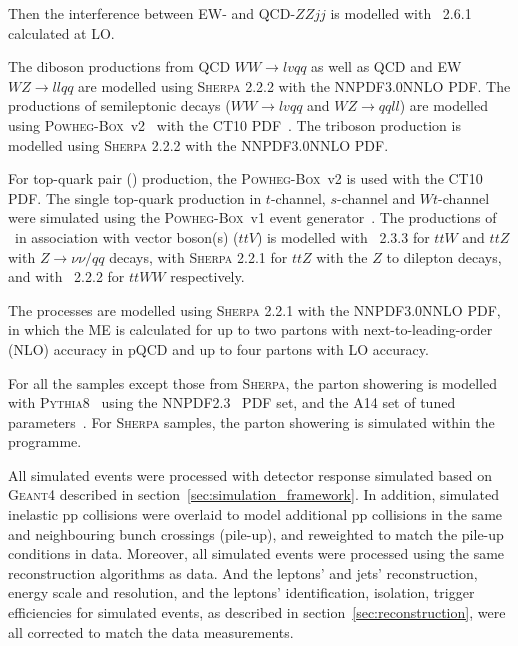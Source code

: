 Then the interference between EW- and QCD-$ZZjj$ is modelled with \MGMCatNLO~2.6.1 calculated at LO.

The diboson productions from QCD $WW \rightarrow lvqq$ as well as QCD and EW $WZ \rightarrow llqq$ are modelled using \textsc{Sherpa} 2.2.2 with the NNPDF3.0NNLO PDF.
The productions of semileptonic decays ($WW \rightarrow lvqq$ and $WZ \rightarrow qqll$) are modelled using \textsc{Powheg-Box}~v2~\cite{Frixione:2007nw} with the CT10 PDF~\cite{Lai:2010vv}.
The triboson production is modelled using \textsc{Sherpa} 2.2.2 with the NNPDF3.0NNLO PDF.

For top-quark pair (\ttbar) production, the \textsc{Powheg-Box}~v2 is used with the CT10 PDF.
The single top-quark production in $t$-channel, $s$-channel and $Wt$-channel were simulated using the \textsc{Powheg-Box}~v1 event generator~\cite{Alioli:2009je,Frederix:2012dh,Re:2010bp}.
The productions of \ttbar~in association with vector boson(s) ($ttV$) is modelled with \MGMCatNLO~2.3.3 for $ttW$ and $ttZ$ with $Z \rightarrow \nu\nu/qq$ decays,
with \textsc{Sherpa} 2.2.1 for $ttZ$ with the $Z$ to dilepton decays,
and with \MGMCatNLO~2.2.2 for $ttWW$ respectively.

The \Zjet processes are modelled using \textsc{Sherpa} 2.2.1 with the NNPDF3.0NNLO PDF, 
in which the ME is calculated for up to two partons with next-to-leading-order (NLO) accuracy in pQCD and up to four partons with LO accuracy.

For all the samples except those from \textsc{Sherpa}, 
the parton showering is modelled with \textsc{Pythia8}~\cite{Sjostrand:2007gs} using the NNPDF2.3~\cite{Ball:2012cx} PDF set,
and the A14 set of tuned parameters~\cite{ATL-PHYS-PUB-2014-021}.
For \textsc{Sherpa} samples, the parton showering is simulated within the programme.

All simulated events were processed with detector response simulated based on \textsc{Geant4} described in section~\ref{sec:simulation_framework}.
In addition, simulated inelastic pp collisions were overlaid to model additional pp collisions in the same and neighbouring bunch crossings (pile-up),
and reweighted to match the pile-up conditions in data.
Moreover, all simulated events were processed using the same reconstruction algorithms as data.
And the leptons' and jets' reconstruction, energy scale and resolution, and the leptons' identification, isolation, trigger efficiencies for simulated events,
as described in section~\ref{sec:reconstruction}, were all corrected to match the data measurements.
